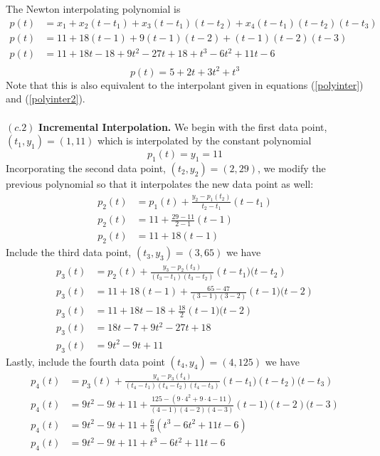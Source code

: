 The Newton interpolating polynomial is
\begin{align*}
p(t) &= x_1 + x_2(t-t_1) + x_3(t-t_1)(t-t_2) + x_4(t-t_1)(t-t_2)(t-t_3)\\
p(t) &= 11 + 18(t-1) + 9(t-1)(t-2) + (t-1)(t-2)(t-3)\\
p(t) &= 11 + 18t - 18 + 9t^2 - 27t + 18 + t^3 - 6t^2 + 11t - 6\\
\end{align*}
\begin{equation}\label{polyinter3}\boxed{
p(t) = 5 + 2t + 3t^2 + t^3
}\end{equation}
Note that this is also equivalent to the interpolant given in equations (\ref{polyinter}) and (\ref{polyinter2}).
\\
\\
$(c.2)$ \textbf{Incremental Interpolation.}
We begin with the first data point, $(t_1, y_1) = (1, 11)$ which is interpolated by the constant polynomial
\begin{equation*}
p_1(t) = y_1 = 11
\end{equation*}
Incorporating the second data point, $(t_2, y_2) = (2, 29)$, we modify the previous polynomial so that it interpolates the new data point as well:
\begin{align*}
p_2(t) &= p_1(t) + \frac{y_2-p_1(t_2)}{t_2-t_1}\left(t-t_1\right) \\
p_2(t) &= 11 + \frac{29-11}{2-1}\left(t-1\right)\\
p_2(t) &= 11 + 18(t-1)
\end{align*}
Include the third data point, $(t_3, y_3) = (3, 65)$ we have
\begin{align*}
p_3(t) &= p_2(t) + \frac{y_3-p_2(t_3)}{(t_3-t_1)(t_3-t_2)}\left(
t-t_1)(t-t_2\right)\\
p_3(t) &= 11 + 18(t-1) + \frac{65-47}{(3-1)(3-2)}\left(
t-1)(t-2\right)\\
p_3(t) &= 11 + 18t - 18 + \frac{18}{2}\left(t-1)(t-2\right)\\
p_3(t) &= 18t - 7 + 9t^2 - 27t + 18\\
p_3(t) &= 9t^2 - 9t + 11
\end{align*}
Lastly, include the fourth data point $(t_4, y_4) = (4, 125)$ we have
\begin{align*}
p_4(t) &= p_3(t) + \frac{y_4-p_3(t_4)}{(t_4-t_1)(t_4-t_2)(t_4-t_3)}\left(t-t_1)(t-t_2)(t-t_3\right) \\
p_4(t) &= 9t^2 - 9t + 11 + \frac{125 - (9\cdot4^2 + 9\cdot4 - 11)}{(4-1)(4-2)(4-3)} \left(t-1)(t-2)(t-3\right) \\
p_4(t) &= 9t^2 - 9t + 11 + \frac{6}{6} \left(t^3-6t^2+11t-6\right) \\
p_4(t) &= 9t^2 - 9t + 11 + t^3 - 6t^2 + 11t - 6
\end{align*}
